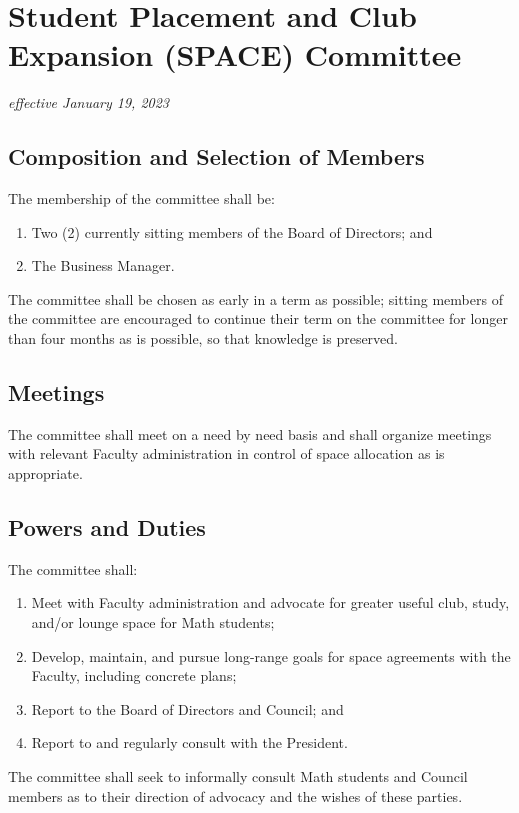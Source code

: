 \section{Student Placement and Club Expansion (SPACE) Committee}
\emph{effective January 19, 2023}\\

\subsection{Composition and Selection of Members}
The membership of the committee shall be:
\begin{enumerate}
    \item Two (2) currently sitting members of the Board of Directors; and
    \item The Business Manager.
\end{enumerate}

The committee shall be chosen as early in a term as possible; sitting members of the committee are encouraged to continue their term on the committee for longer than four months as is possible, so that knowledge is preserved.

\subsection{Meetings}
The committee shall meet on a need by need basis and shall organize meetings with relevant Faculty administration in control of space allocation as is appropriate.

\subsection{Powers and Duties}
The committee shall: 
\begin{enumerate}
    \item Meet with Faculty administration and advocate for greater useful club, study, and/or lounge space for Math students;
    \item Develop, maintain, and pursue long-range goals for space agreements with the Faculty, including concrete plans;
    \item Report to the Board of Directors and Council; and
    \item Report to and regularly consult with the President.
\end{enumerate}
The committee shall seek to informally consult Math students and Council members as to their direction of advocacy and the wishes of these parties.
